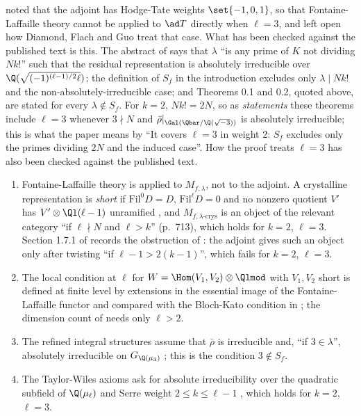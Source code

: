 \begin{remark}[does Diamond, Flach and Guo's theorem cover $\ell=3$ in weight $2$?]\label{rem:congruence:ell-three}
 noted that the adjoint has Hodge-Tate weights $\set{-1,0,1}$, so that Fontaine-Laffaille theory cannot be applied to $\ad T$ directly when $\ell=3$, and left open
how Diamond, Flach and Guo treat that case. What has been checked against the published text is this. The abstract of \cite{DFG04} says that $\lambda$ ``is any prime of $K$ not dividing
$Nk!$'' such that the residual representation is absolutely irreducible over $\Q(\sqrt{(-1)^{(\ell-1)/2}\ell})$; the definition of $S_f$ in the introduction excludes only $\lambda\mid Nk!$ and the
non-absolutely-irreducible case; and Theorems 0.1 and 0.2, quoted above, are stated for every $\lambda\notin S_f$. For $k=2$, $Nk!=2N$, so as \emph{statements} these theorems include $\ell=3$ whenever
$3\nmid N$ and $\bar\rho|_{\Gal(\Qbar/\Q(\sqrt{-3}))}$ is absolutely irreducible; this is what the paper means by ``It covers $\ell=3$ in weight $2$: $S_f$ excludes only the primes dividing $2N$ and the induced case''.
How the proof treats $\ell=3$ has also been checked against the published text.
\begin{enumerate}[label=(\arabic*)]
\item Fontaine-Laffaille theory is applied to $M_{f,\lambda}$, not to the adjoint. A crystalline representation is \emph{short} if $\mathrm{Fil}^0D=D$, $\mathrm{Fil}^\ell D=0$ and no nonzero quotient
$V'$ has $V'\otimes\Ql(\ell-1)$ unramified \cite[Section 1.1.2]{DFG04}, and $M_{f,\lambda\text{-crys}}$ is an object of the relevant category ``if $\ell\nmid N$ and $\ell>k$'' (p.~713), which holds for
$k=2$, $\ell=3$. Section 1.7.1 of \cite{DFG04} records the obstruction of : the adjoint gives such an object only after twisting ``if $\ell-1>2(k-1)$'', which fails for $k=2$, $\ell=3$.
\item The local condition at $\ell$ for $W=\Hom(V_1,V_2)\otimes\Qlmod$ with $V_1,V_2$ short is defined at finite level by extensions in the essential image of the Fontaine-Laffaille functor and
compared with the Bloch-Kato condition in \cite[Proposition 2.2]{DFG04}; the dimension count of \cite[Corollary 2.3]{DFG04} needs only $\ell>2$.
\item The refined integral structures assume that $\bar\rho$ is irreducible and, ``if $3\in\lambda$'', absolutely irreducible on $G_{\Q(\mu_3)}$ \cite[Section 1.8]{DFG04}; this is the condition $3\notin S_f$.
\item The Taylor-Wiles axioms ask for absolute irreducibility over the quadratic subfield of $\Q(\mu_\ell)$ and Serre weight $2\le k\le\ell-1$ \cite[Section 3.1]{DFG04}, which holds for $k=2$, $\ell=3$.

\end{enumerate}
\end{remark}

